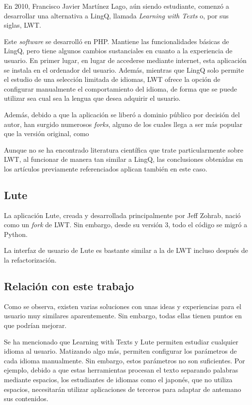 En 2010, Francisco Javier Martínez Lago, aún siendo estudiante, comenzó a desarrollar una alternativa a LingQ, llamada \textit{Learning with Texts} o, por sus siglas, LWT. \autocite{LWT}

Este \textit{software} se desarrolló en PHP. Mantiene las funcionalidades básicas de LingQ, pero tiene algunos cambios sustanciales en cuanto a la experiencia de usuario. En primer lugar, en lugar de accederse mediante internet, esta aplicación se instala en el ordenador del usuario. Además, mientras que LingQ solo permite el estudio de una selección limitada de idiomas, LWT ofrece la opción de configurar manualmente el comportamiento del idioma, de forma que se puede utilizar sea cual sea la lengua que desea adquirir el usuario.

Además, debido a que la aplicación se liberó a dominio público por decisión del autor, han surgido numerosos \textit{forks}, alguno de los cuales llega a ser más popular que la versión original, como

Aunque no se ha encontrado literatura científica que trate particularmente sobre LWT, al funcionar de manera tan similar a LingQ, las conclusiones obtenidas en los artículos previamente referenciados aplican también en este caso.

\subsection{Lute}

La aplicación Lute, creada y desarrollada principalmente por Jeff Zohrab, nació como un \textit{fork} de LWT. Sin embargo, desde su versión 3, todo el código se migró a Python. \autocite{Lute}

La interfaz de usuario de Lute es bastante similar a la de LWT incluso después de la refactorización. 

\subsection{Relación con este trabajo}

Como se observa, existen varias soluciones con unas ideas y experiencias para el usuario muy similares aparentemente. Sin embargo, todas ellas tienen puntos en que podrían mejorar.

Se ha mencionado que Learning with Texts y Lute permiten estudiar cualquier idioma al usuario. Matizando algo más, permiten configurar los parámetros de cada idioma manualmente. Sin embargo, estos parámetros no son suficientes. Por ejemplo, debido a que estas herramientas procesan el texto separando palabras mediante espacios, los estudiantes de idiomas como el japonés, que no utiliza espacios, necesitarán utilizar aplicaciones de terceros para adaptar de antemano sus contenidos.

